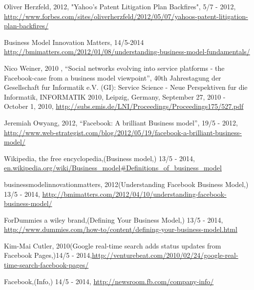 \documentclass[conference]{IEEEtran}
\begin{document}
\begin{thebibliography}{1}
Oliver Herzfeld, 2012, "Yahoo's Patent Litigation Plan Backfires", 5/7 - 2012, \url{http://www.forbes.com/sites/oliverherzfeld/2012/05/07/yahoos-patent-litigation-plan-backfires/}


Business Model Innovation Matters,
14/5-2014
\href{http://bmimatters.com/2012/01/08/understanding-business-model-fundamentals/}{http://bmimatters.com/2012/01/08/understanding-business-model-fundamentals/}

Nico Weiner, 2010 , “Social networks evolving into service platforms - the
Facebook-case from a business model viewpoint”, 40th Jahrestagung der
Gesellschaft fur Informatik e.V. (GI): Service Science - Neue Perspektiven fur
die Informatik, INFORMATIK 2010, Leipzig, Germany, September 27, 2010 - October
1, 2010, \href{http://subs.emis.de/LNI/Proceedings/Proceedings175/527.pdf}{http://subs.emis.de/LNI/Proceedings/Proceedings175/527.pdf}

Jeremiah Owyang, 2012, “Facebook: A brilliant Business model”, 19/5 - 2012,
\href{http://www.web-strategist.com/blog/2012/05/19/facebook-a-brilliant-business-model/}{http://www.web-strategist.com/blog/2012/05/19/facebook-a-brilliant-business-model/}

Wikipedia, the free encyclopedia,(Business model,) 13/5 - 2014, \href{en.wikipedia.org/wiki/Business\_model\#Definitions\_of\_business\_model}{en.wikipedia.org/wiki/Business\_model\#Definitions\_of\_business\_model}

businessmodelinnovationmatters,
2012(Understanding Facebook Business Model,) 13/5 - 2014, \href{http://bmimatters.com/2012/04/10/understanding-facebook-business-model/}{http://bmimatters.com/2012/04/10/understanding-facebook-business-model/}

ForDummies a wiley brand,(Defining Your Business Model,) 13/5 - 2014, \href{http://www.dummies.com/how-to/content/defining-your-business-model.html}{http://www.dummies.com/how-to/content/defining-your-business-model.html}

Kim-Mai Cutler,
2010(Google real-time search adds status updates from Facebook Pages,)14/5 - 2014,\href{http://venturebeat.com/2010/02/24/google-real-time-search-facebook-pages/}{http://venturebeat.com/2010/02/24/google-real-time-search-facebook-pages/}

Facebook,(Info,) 14/5 - 2014, \href{http://newsroom.fb.com/company-info/}{http://newsroom.fb.com/company-info/}


\end{thebibliography}
\end{document}
